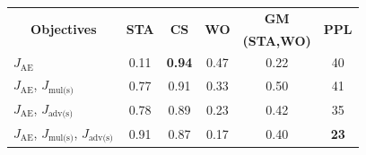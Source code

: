 \documentclass[letterpaper]{article} %
\newcommand{\tabc}[2]{\multicolumn{1}{|c||}{\multirow{#1}{*}{\textbf{#2}}}}
\newcommand{\loss}[1]{J_{\text{#1}}}
\begin{document}
\begin{table}[ht]
	\centering\vspace{-.2cm}
	\begin{tabular}{| l || c | c | c | c | c |}
		\hline
		\tabc{2}{Objectives}                                                            & \multirow{2}{*}{\textbf{STA}} & \multirow{2}{*}{\textbf{CS}} & \multirow{2}{*}{\textbf{WO}} & \textbf{GM}       & \multirow{2}{*}{\textbf{PPL}} \\
		                                                                                &                               &                              &                              & \textbf{(STA,WO)} &                               \\
		\hline\hline
		$\loss{AE}$                                                                     & 0.11                          & \textbf{0.94}                & 0.47                         & 0.22              & 40                            \\ \hline
		$\loss{AE}$, $\loss{mul(s)}$                                                    & 0.77                          & 0.91                         & 0.33                         & 0.50              & 41                            \\ \hline
		$\loss{AE}$, $\loss{adv(s)}$                                                    & 0.78                          & 0.89                         & 0.23                         & 0.42              & 35                            \\ \hline
		$\loss{AE}$, $\loss{mul(s)}$, $\loss{adv(s)}$                                   & 0.91                          & 0.87                         & 0.17                         & 0.40              & \textbf{23}                   \\ \hline

\end{tabular}
\end{table}
\end{document}
